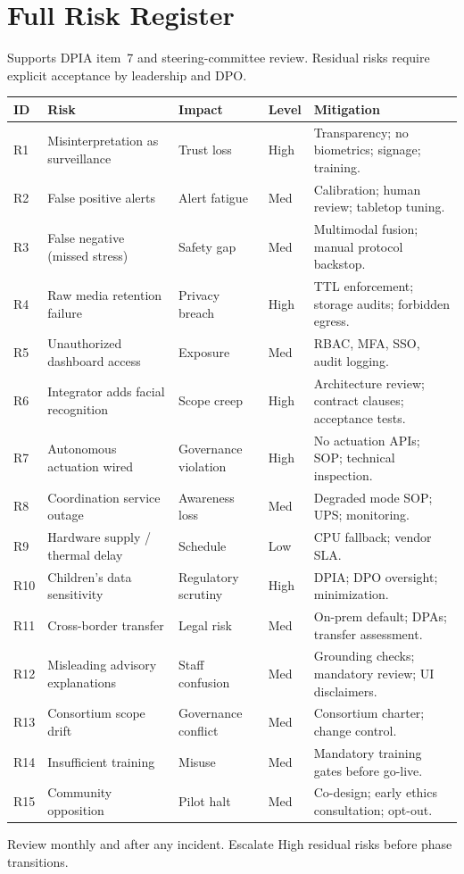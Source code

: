 \section{Full Risk Register}
\label{app:risk-register}
\label{sec:risk-register}

Supports DPIA item~7 and steering-committee review.
Residual risks require explicit acceptance by leadership and DPO.

\begin{longtable}{@{}p{0.9cm}p{3.0cm}p{1.8cm}p{1.6cm}p{4.6cm}@{}}
\toprule
ID & Risk & Impact & Level & Mitigation \\
\midrule
\endhead
R1 & Misinterpretation as surveillance & Trust loss & High &
  Transparency; no biometrics; signage; training. \\
R2 & False positive alerts & Alert fatigue & Med &
  Calibration; human review; tabletop tuning. \\
R3 & False negative (missed stress) & Safety gap & Med &
  Multimodal fusion; manual protocol backstop. \\
R4 & Raw media retention failure & Privacy breach & High &
  TTL enforcement; storage audits; forbidden egress. \\
R5 & Unauthorized dashboard access & Exposure & Med &
  RBAC, MFA, SSO, audit logging. \\
R6 & Integrator adds facial recognition & Scope creep & High &
  Architecture review; contract clauses; acceptance tests. \\
R7 & Autonomous actuation wired & Governance violation & High &
  No actuation APIs; SOP; technical inspection. \\
R8 & Coordination service outage & Awareness loss & Med &
  Degraded mode SOP; UPS; monitoring. \\
R9 & Hardware supply / thermal delay & Schedule & Low &
  CPU fallback; vendor SLA. \\
R10 & Children's data sensitivity & Regulatory scrutiny & High &
  DPIA; DPO oversight; minimization. \\
R11 & Cross-border transfer & Legal risk & Med &
  On-prem default; DPAs; transfer assessment. \\
R12 & Misleading advisory explanations & Staff confusion & Med &
  Grounding checks; mandatory review; UI disclaimers. \\
R13 & Consortium scope drift & Governance conflict & Med &
  Consortium charter; change control. \\
R14 & Insufficient training & Misuse & Med &
  Mandatory training gates before go-live. \\
R15 & Community opposition & Pilot halt & Med &
  Co-design; early ethics consultation; opt-out. \\
\bottomrule
\end{longtable}

Review monthly and after any incident.
Escalate High residual risks before phase transitions.
